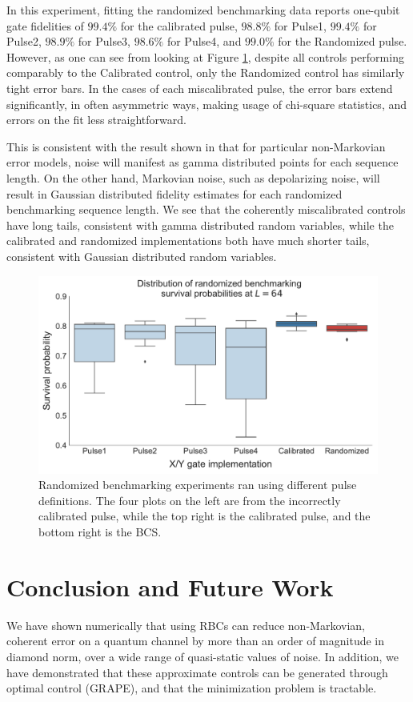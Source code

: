 \documentclass[aps,nofootinbib,pra,notitlepage,twocolumn]{revtex4-1}
\begin{document}
In this experiment, fitting the randomized benchmarking data reports one-qubit gate fidelities of $99.4\%$ for the calibrated pulse, $98.8\%$ for Pulse1, $99.4\%$ for Pulse2, $98.9\%$ for Pulse3, $98.6\%$ for Pulse4, and $99.0\%$ for the Randomized pulse. However, as one can see from looking at Figure \ref{fig:rb}, despite all controls performing comparably to the Calibrated control, only the Randomized control has similarly tight error bars. In the cases of each miscalibrated pulse, the error bars extend significantly, in often asymmetric ways, making usage of chi-square statistics, and errors on the fit less straightforward.

This is consistent with the result shown in \cite{Ball2016} that for particular non-Markovian error models, noise will manifest as gamma distributed points for each sequence length. On the other hand, Markovian noise, such as depolarizing noise, will result in Gaussian distributed fidelity estimates for each randomized benchmarking sequence length. We see that the coherently miscalibrated controls have long tails, consistent with gamma distributed random variables, while the calibrated and randomized implementations both have much shorter tails, consistent with Gaussian distributed random variables.

\begin{figure}
  \centering
  \includegraphics[width=\columnwidth]{rb_data.pdf}
  \caption{Randomized benchmarking experiments ran using different pulse definitions. The four plots on the left are from the incorrectly calibrated pulse, while the top right is the calibrated pulse, and the bottom right is the BCS.}
  \label{fig:rb}
\end{figure}

\section{Conclusion and Future Work}
We have shown numerically that using RBCs can reduce non-Markovian, coherent error on a quantum channel by more than an order of magnitude in diamond norm, over a wide range of quasi-static values of noise. In addition, we have demonstrated that these approximate controls can be generated through optimal control (GRAPE), and that the minimization problem is tractable.
\end{document}
